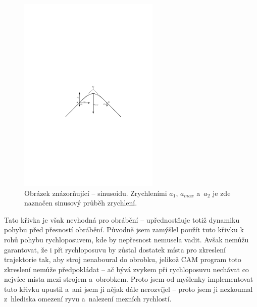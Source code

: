 		\begin{figure}[h]
			\centering
			\includegraphics[width=0.6\textwidth]{img/sinusoida.pdf}
			\caption{Obrázek znázorňující  -- sinusoidu. Zrychleními $a_1$, $a_{max}$ a~$a_2$ je zde naznačen sinusový průběh zrychlení.} \label{obrazek:sinusoida}
		\end{figure}
		
		Tato křivka je však nevhodná pro obrábění -- upřednostňuje totiž dynamiku pohybu před přesností obrábění. Původně jsem zamýšlel použít tuto křivku k~ rohů pohybu rychloposuvem, kde by nepřesnost nemusela vadit. Avšak nemůžu garantovat, že i při rychloposuvu by zůstal dostatek místa pro zkreslení trajektorie tak, aby stroj nenaboural do obrobku, jelikož CAM program toto zkreslení nemůže předpokládat -- ač bývá zvykem při rychloposuvu nechávat co nejvíce místa mezi strojem a~obrobkem. Proto jsem od myšlenky implementovat tuto křivku upustil a~ani jsem ji nějak dále nerozvíjel -- proto jsem ji nezkoumal z~hlediska omezení ryvu a~nalezení mezních rychlostí.